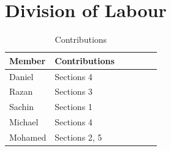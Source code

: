 \documentclass[12pt]{article}
\begin{document}
	
\newpage

\newpage
\appendix
\section{Division of Labour}
\label{sec:division_of_labour}
\begin{table}[H]
    \begin{center}
        \begin{tabular}{| p{0.30\linewidth} | p{0.70\linewidth} |}
            \hline
            \textbf{Member} & \textbf{Contributions}\\
            \hline
            Daniel & Sections 4\\
            
            Razan & Sections 3\\
            
            Sachin & Sections 1\\
            
            Michael & Sections 4\\
            
            Mohamed & Sections 2, 5\\
            \hline
        \end{tabular}
        \caption{Contributions} \label{tab:Contributions}
    \end{center}
\end{table}

\end{document}
